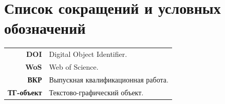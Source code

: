 \chapter*{Список сокращений и условных обозначений}             %
\noindent
\addtocounter{table}{-1}%
\begin{longtable}{@{}r p{}@{}} %
\textbf{DOI} & Digital Object Identifier. \\
\textbf{WoS} & Web of Science. \\
\textbf{ВКР}  & Выпускная квалификационная работа. \\
\textbf{ТГ-объект}  & Текстово-графический объект. \\
%

\end{longtable}
